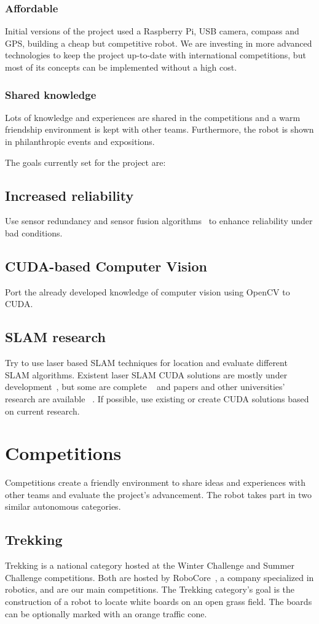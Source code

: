 \documentclass[conference]{IEEEtran}
\begin{document}
\subsubsection{Affordable}
Initial versions of the project used a Raspberry Pi, USB camera, compass and
GPS, building a cheap but competitive robot. We are investing in more advanced
technologies to keep the project up-to-date with international competitions, but
most of its concepts can be implemented without a high cost.
\subsubsection{Shared knowledge}
Lots of knowledge and experiences are shared in the competitions and a warm
friendship environment is kept with other teams. Furthermore, the robot is
shown in philanthropic events and expositions.

\medskip
The goals currently set for the project are:
\setcounter{subsection}{0}
\subsection{Increased reliability} Use sensor redundancy and sensor fusion
algorithms~\cite{kalman} to enhance reliability under bad conditions.
\subsection{CUDA-based Computer Vision} Port the already developed knowledge of
computer vision using OpenCV to CUDA.
\subsection{SLAM research} Try to use laser based SLAM techniques for
location and evaluate different SLAM algorithms. Existent laser SLAM CUDA
solutions are mostly under development~\cite{CUDA-PHDSLAM}, but some are complete
~\cite{rgbdslam_v2} and papers and other universities' research are available
~\cite{CUDA-IEEE}. If possible, use existing or create CUDA solutions based on current
research.

\section{Competitions}
\setcounter{subsection}{0}
Competitions create a friendly environment to share ideas and experiences with
other teams and evaluate the project's advancement. The robot takes part in two
similar autonomous categories.
\subsection{Trekking}
Trekking is a national category hosted at the Winter Challenge and Summer
Challenge competitions. Both are hosted by RoboCore~\cite{RoboCore}, a company
specialized in robotics, and are our main competitions. The Trekking category's
goal is the construction of a robot to locate white boards on an open grass field.
The boards can be optionally marked with an orange traffic cone.
\end{document}
